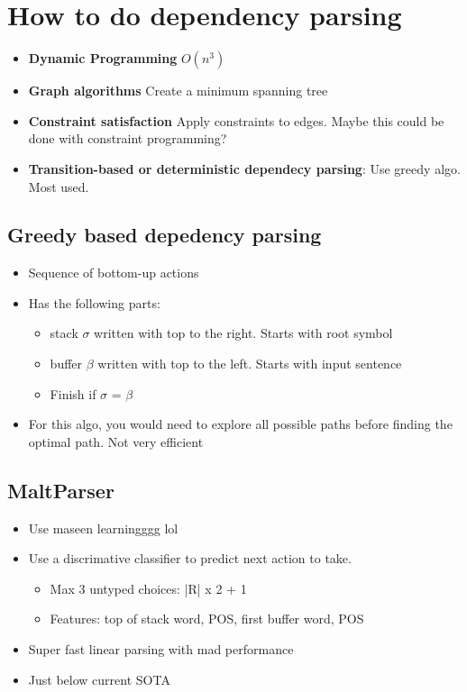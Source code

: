 \documentclass[a4paper]{article}
\begin{document}
\section{How to do dependency parsing}
\begin{itemize}
    \item \textbf{Dynamic Programming}  $O(n^3)$ 
    \item \textbf{Graph algorithms} Create a minimum spanning tree 
    \item \textbf{Constraint satisfaction} Apply constraints to edges. Maybe this could be done with constraint programming? 
    \item \textbf{Transition-based or deterministic dependecy parsing}: Use greedy algo. Most used.
\end{itemize}
\subsection{Greedy based depedency parsing}
\begin{itemize}
    \item Sequence of bottom-up actions
    \item Has the following parts:
    \begin{itemize}
        \item stack $\sigma$ written with top to the right. Starts with root symbol
        \item buffer $ \beta$ written with top to the left. Starts with input sentence
        \item Finish if $\sigma$ = $\beta$
    \end{itemize}
    \item For this algo, you would need to explore all possible paths before finding the optimal path. Not very efficient
\end{itemize}
\subsection{MaltParser}
\begin{itemize}
    \item Use maseen learningggg lol
    \item Use a discrimative classifier to predict next action to take.
    \begin{itemize}
        \item Max 3 untyped choices: |R| x 2 + 1
        \item Features: top of stack word, POS, first buffer word, POS
    \end{itemize}
    \item Super fast linear parsing with mad performance
    \item Just below current SOTA
\end{itemize}
\end{document}

